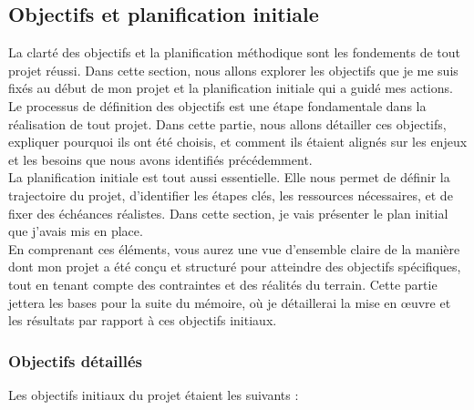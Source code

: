 \documentclass[a4paper, 12pt, french]{article}
\begin{document}
			\subsection{Objectifs et planification initiale}
				La clarté des objectifs et la planification méthodique sont les fondements de tout projet réussi. Dans cette section, nous allons explorer les objectifs que je me suis fixés au début de mon projet et la planification initiale qui a guidé mes actions.\\

				Le processus de définition des objectifs est une étape fondamentale dans la réalisation de tout projet. Dans cette partie, nous allons détailler ces objectifs, expliquer pourquoi ils ont été choisis, et comment ils étaient alignés sur les enjeux et les besoins que nous avons identifiés précédemment.\\

				La planification initiale est tout aussi essentielle. Elle nous permet de définir la trajectoire du projet, d'identifier les étapes clés, les ressources nécessaires, et de fixer des échéances réalistes. Dans cette section, je vais présenter le plan initial que j'avais mis en place.\\

				En comprenant ces éléments, vous aurez une vue d'ensemble claire de la manière dont mon projet a été conçu et structuré pour atteindre des objectifs spécifiques, tout en tenant compte des contraintes et des réalités du terrain. Cette partie jettera les bases pour la suite du mémoire, où je détaillerai la mise en œuvre et les résultats par rapport à ces objectifs initiaux.
				\newpage
				\subsubsection{Objectifs détaillés}
				\noindent Les objectifs initiaux du projet étaient les suivants :
	
\end{document}
